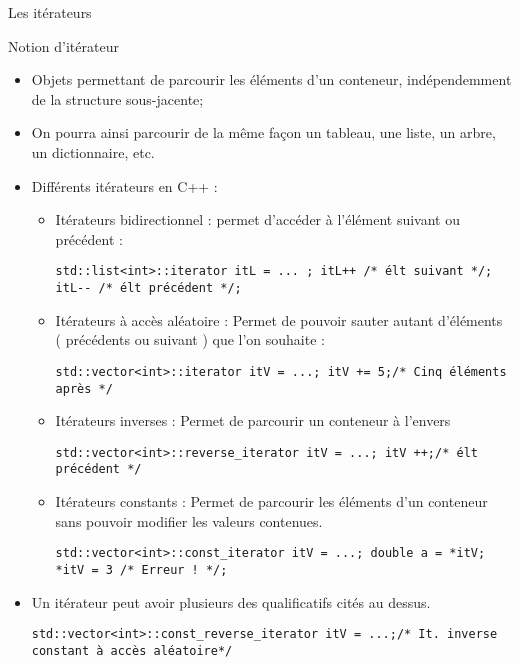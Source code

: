 \documentclass[handout,10pt]{beamer}
\begin{document}
\begin{frame}[fragile]{Les itérateurs}
\tiny
\begin{block}{Notion d'itérateur}
\begin{itemize}
 \item Objets permettant de parcourir les éléments d'un conteneur, indépendemment de la structure sous-jacente;
 \item On pourra ainsi parcourir de la même façon un tableau, une liste, un arbre, un dictionnaire, etc.
 \item Différents itérateurs en C++ :
 \begin{itemize}
 \item Itérateurs bidirectionnel : permet d'accéder à l'élément suivant ou précédent :
 \begin{lstlisting}
std::list<int>::iterator itL = ... ; itL++ /* élt suivant */; itL-- /* élt précédent */;\end{lstlisting}
 \item Itérateurs à accès aléatoire : Permet de pouvoir sauter autant d'éléments ( précédents ou suivant ) que l'on souhaite :
 \begin{lstlisting}
std::vector<int>::iterator itV = ...; itV += 5;/* Cinq éléments après */
\end{lstlisting}
 \item Itérateurs inverses : Permet de parcourir un conteneur à l'envers
 \begin{lstlisting}
std::vector<int>::reverse_iterator itV = ...; itV ++;/* élt précédent */
\end{lstlisting}
 \item Itérateurs constants : Permet de parcourir les éléments d'un conteneur sans pouvoir modifier les valeurs contenues.
 \begin{lstlisting}
std::vector<int>::const_iterator itV = ...; double a = *itV; *itV = 3 /* Erreur ! */; 
\end{lstlisting}
 \end{itemize}
 \item Un itérateur peut avoir plusieurs des qualificatifs cités au dessus.
\begin{lstlisting}
std::vector<int>::const_reverse_iterator itV = ...;/* It. inverse constant à accès aléatoire*/
\end{lstlisting}
\end{itemize}
\end{block}
\end{frame}
\end{document}

